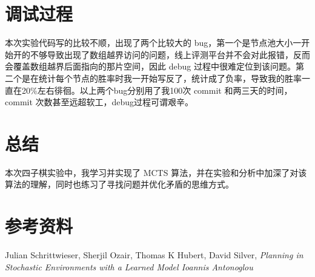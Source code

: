 \documentclass{article}
\begin{document}
\begin{spacing}{1.1}
\section{调试过程}
\hspace{1.4em}	
本次实验代码写的比较不顺，出现了两个比较大的 bug，第一个是节点池大小一开始开的不够导致出现了数组越界访问的问题，线上评测平台并不会对此报错，反而会覆盖数组越界后面指向的那片空间，因此 debug 过程中很难定位到该问题。第二个是在统计每个节点的胜率时我一开始写反了，统计成了负率，导致我的胜率一直在20\%左右徘徊。以上两个bug分别用了我100次 commit 和两三天的时间，commit 次数甚至远超软工，debug过程可谓艰辛。
\section{总结}
\hspace{1.4em}	
本次四子棋实验中，我学习并实现了 MCTS 算法，并在实验和分析中加深了对该算法的理解，同时也练习了寻找问题并优化矛盾的思维方式。
\section{参考资料}
Julian Schrittwieser, Sherjil Ozair, Thomas K Hubert, David Silver, \textit{Planning in Stochastic Environments with a Learned Model Ioannis Antonoglou}
	

\end{spacing}
\end{document}
